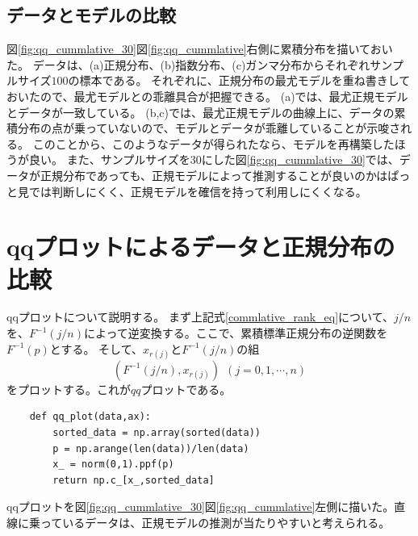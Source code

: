 \subsection{データとモデルの比較}
図\ref{fig:qq_cummlative_30}図\ref{fig:qq_cummlative}右側に累積分布を描いておいた。
データは、(a)正規分布、(b)指数分布、(c)ガンマ分布からそれぞれサンプルサイズ$100$の標本である。
それぞれに、正規分布の最尤モデルを重ね書きしておいたので、最尤モデルとの乖離具合が把握できる。
(a)では、最尤正規モデルとデータが一致している。
(b,c)では、最尤正規モデルの曲線上に、データの累積分布の点が乗っていないので、モデルとデータが乖離していることが示唆される。
このことから、このようなデータが得られたなら、モデルを再構築したほうが良い。
また、サンプルサイズを30にした図\ref{fig:qq_cummlative_30}では、データが正規分布であっても、正規モデルによって推測することが良いのかはぱっと見では判断しにくく、正規モデルを確信を持って利用しにくくなる。

\section{qqプロットによるデータと正規分布の比較}
qqプロットについて説明する。
まず上記式\ref{commlative_rank_eq}について、$j/n$を、$F^{-1}(j/n)$によって逆変換する。ここで、累積標準正規分布の逆関数を$F^{-1}(p)$とする。
そして、$x_{r(j)}$と$F^{-1}(j/n)$の組
\begin{equation*}
(F^{-1}(j/n), x_{r(j)}) \ \ (j=0,1,\cdots,n)
\end{equation*}
をプロットする。これが$qq$プロットである。

\begin{lstlisting}
    def qq_plot(data,ax):
        sorted_data = np.array(sorted(data))
        p = np.arange(len(data))/len(data)
        x_ = norm(0,1).ppf(p)
        return np.c_[x_,sorted_data]
\end{lstlisting}


qqプロットを図\ref{fig:qq_cummlative_30}図\ref{fig:qq_cummlative}左側に描いた。直線に乗っているデータは、正規モデルの推測が当たりやすいと考えられる。

